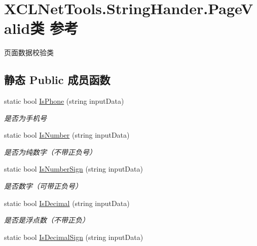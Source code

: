 \hypertarget{class_x_c_l_net_tools_1_1_string_hander_1_1_page_valid}{}\section{X\+C\+L\+Net\+Tools.\+String\+Hander.\+Page\+Valid类 参考}
\label{class_x_c_l_net_tools_1_1_string_hander_1_1_page_valid}


页面数据校验类  


\subsection*{静态 Public 成员函数}
\begin{DoxyCompactItemize}
\item 
static bool \hyperlink{class_x_c_l_net_tools_1_1_string_hander_1_1_page_valid_aeb849c3d8a38a3ef6a5eea5097d2abc0}{Is\+Phone} (string input\+Data)
\begin{DoxyCompactList}\small\item\em 是否为手机号 \end{DoxyCompactList}\item 
static bool \hyperlink{class_x_c_l_net_tools_1_1_string_hander_1_1_page_valid_a5ef94c663cc81c8380957575ef31b11e}{Is\+Number} (string input\+Data)
\begin{DoxyCompactList}\small\item\em 是否为纯数字（不带正负号） \end{DoxyCompactList}\item 
static bool \hyperlink{class_x_c_l_net_tools_1_1_string_hander_1_1_page_valid_a91c3575738db7370e02e7698ef909695}{Is\+Number\+Sign} (string input\+Data)
\begin{DoxyCompactList}\small\item\em 是否数字（可带正负号） \end{DoxyCompactList}\item 
static bool \hyperlink{class_x_c_l_net_tools_1_1_string_hander_1_1_page_valid_aa118db22190ca7a7821c56a6240d0faf}{Is\+Decimal} (string input\+Data)
\begin{DoxyCompactList}\small\item\em 是否是浮点数（不带正负） \end{DoxyCompactList}\item 
static bool \hyperlink{class_x_c_l_net_tools_1_1_string_hander_1_1_page_valid_a9ff1027a295262204a6adb0276177989}{Is\+Decimal\+Sign} (string input\+Data)

\end{DoxyCompactItemize}
